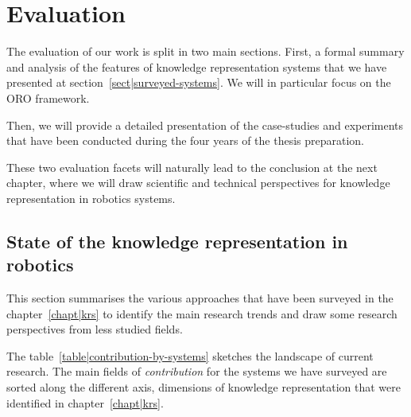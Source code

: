 \chapter{Evaluation}
\label{chapt|evaluation}

The evaluation of our work is split in two main sections. First, a formal
summary and analysis of the features of knowledge representation systems that
we have presented at section~\ref{sect|surveyed-systems}. We will in particular
focus on the ORO framework.

Then, we will provide a detailed presentation of the case-studies and
experiments that have been conducted during the four years of the thesis
preparation.

These two evaluation facets will naturally lead to the conclusion at the next
chapter, where we will draw scientific and technical perspectives for knowledge
representation in robotics systems.


\section{State of the knowledge representation in robotics}
\label{sect|evaluation-oroserver}

This section summarises the various approaches that have been surveyed in the
chapter~\ref{chapt|krs} to identify the main research trends and draw some
research perspectives from less studied fields.

The table~\ref{table|contribution-by-systems} sketches the landscape of current
research. The main fields of \emph{contribution} for the systems we have
surveyed are sorted along the different axis, dimensions of knowledge
representation that were identified in chapter~\ref{chapt|krs}.


